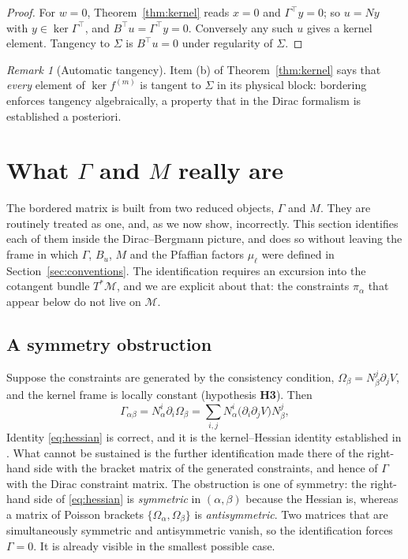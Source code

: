 \documentclass[12pt]{article}
\theoremstyle{plain}
\theoremstyle{definition}
\theoremstyle{remark}
\newtheorem{remark}[theorem]{Remark}
\newcommand{\pd}[1]{\partial_{#1}}
\newcommand{\Om}{\Omega}
\newcommand{\Mm}{\mathcal{M}}
\begin{document}
	\begin{proof}
		For $w=0$, Theorem~\ref{thm:kernel} reads $x=0$ and $\Gamma^{\top}y=0$; so
		$u=Ny$ with $y\in\ker\Gamma^{\top}$, and $B^{\top}u=\Gamma^{\top}y=0$.
		Conversely any such $u$ gives a kernel element. Tangency to $\Sigma$ is
		$B^{\top}u=0$ under regularity of $\Sigma$.
	\end{proof}
	
	\begin{remark}[Automatic tangency]
		\label{rem:tangency}
		Item (b) of Theorem~\ref{thm:kernel} says that \emph{every} element of
		$\ker f^{(m)}$ is tangent to $\Sigma$ in its physical block: bordering enforces
		tangency algebraically, a property that in the Dirac formalism is established a
		posteriori.
	\end{remark}
	
	\section{What \texorpdfstring{$\Gamma$}{Gamma} and \texorpdfstring{$M$}{M} really are}
	\label{sec:dirac}
	
	The bordered matrix is built from two reduced objects, $\Gamma$ and $M$. They are
	routinely treated as one, and, as we now show, incorrectly. This section
	identifies each of them inside the Dirac--Bergmann picture, and does so without
	leaving the frame in which $\Gamma$, $B_{u}$, $M$ and the Pfaffian factors
	$\mu_{\ell}$ were defined in Section~\ref{sec:conventions}. The identification
	requires an excursion into the cotangent bundle $T^{*}\Mm$, and we are explicit
	about that: the constraints $\pi_{\alpha}$ that appear below do not live on
	$\Mm$.
	
	\subsection{A symmetry obstruction}
	\label{sec:obstruction}
	
	Suppose the constraints are generated by the consistency condition,
	$\Om_{\beta}=N_{\beta}^{j}\pd{j}V$, and the kernel frame is locally constant
	(hypothesis \textbf{H3}). Then
	\begin{equation}
		\Gamma_{\alpha\beta}=N_{\alpha}^{i}\pd{i}\Om_{\beta}
		=\sum_{i,j}N_{\alpha}^{i}\bigl(\pd{i}\pd{j}V\bigr)N_{\beta}^{j},
		\label{eq:hessian}
	\end{equation}
	Identity \eqref{eq:hessian} is correct, and it is the kernel--Hessian identity
	established in \cite{CLMCP2026}. What cannot be sustained is the further
	identification made there of the right-hand side with the bracket matrix of the
	generated constraints, and hence of $\Gamma$ with the Dirac constraint matrix.
	The obstruction is one of symmetry: the right-hand side of \eqref{eq:hessian} is
	\emph{symmetric} in $(\alpha,\beta)$ because the Hessian is, whereas a matrix of
	Poisson brackets $\{\Om_{\alpha},\Om_{\beta}\}$ is \emph{antisymmetric}. Two
	matrices that are simultaneously symmetric and antisymmetric vanish, so the
	identification forces $\Gamma=0$. It is already visible in the smallest possible
	case.
	
\end{document}
